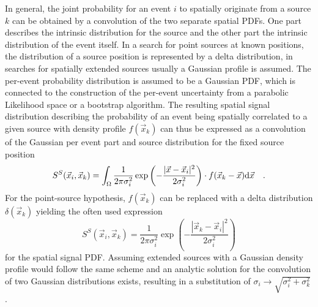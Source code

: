 In general, the joint probability for an event $i$ to spatially originate from a source $k$ can be obtained by a convolution of the two separate spatial PDFs.
One part describes the intrinsic distribution for the source and the other part the intrinsic distribution of the event itself.
In a search for point sources at known positions, the distribution of a source position is represented by a delta distribution, in searches for spatially extended sources usually a Gaussian profile is assumed.
The per-event probability distribution is assumed to be a Gaussian PDF, which is connected to the construction of the per-event uncertainty from a parabolic Likelihood space or a bootstrap algorithm.
The resulting spatial signal distribution describing the probability of an event being spatially correlated to a given source with density profile $f(\vec{x}_k)$ can thus be expressed as a convolution of the Gaussian per event part and source distribution for the fixed source position
\begin{equation}
  S^S(\vec{x}_i, \vec{x}_k)
  = \int_\Omega \frac{1}{2\pi \sigma_i^2}
    \exp\left(-\frac{|\vec{x}-\vec{x}_i|^2}{2\sigma_i^2}\right) \cdot
    f(\vec{x}_k - \vec{x}) \mathrm{d}\vec{x} \\
    \quad\text{.}
\end{equation}
For the point-source hypothesis, $f(\vec{x}_k)$ can be replaced with a delta distribution $\delta(\vec{x}_k)$ yielding the often used expression
\begin{equation}
  S^S(\vec{x}_i, \vec{x}_k)
  = \frac{1}{2\pi \sigma_i^2}
    \exp\left(-\frac{|\vec{x}_k-\vec{x}_i|^2}
                    {2\sigma_i^2}\right)
\end{equation}
for the spatial signal PDF.
Assuming extended sources with a Gaussian density profile would follow the same scheme and an analytic solution for the convolution of two Gaussian distributions exists, resulting in a substitution of $\sigma_i \rightarrow \sqrt{\sigma_i^2 + \sigma_k^2}$ .


